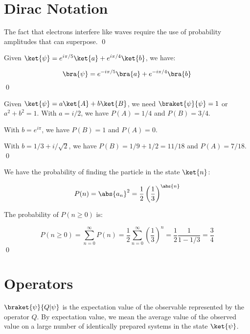 \documentclass[12pt]{article}
\begin{document}



\pagebreak
\section*{Dirac Notation}


The fact that electrons interfere like waves require the use of probability amplitudes that can superpose.
\qed


Given $\ket{\psi} = e^{i\pi/5} \ket{a} + e^{i\pi/4} \ket{b}$, we have:

\begin{equation}
    \bra{\psi} = e^{-i\pi/5} \bra{a} + e^{-i\pi/4} \bra{b}
\end{equation}
\qed



Given $\ket{\psi} = a \ket{A} + b \ket{B}$, we need $\braket{\psi}{\psi} = 1$ or $a^2 + b^2 = 1$. With $a = i/2$, we have $P(A) = 1/4$ and $P(B) = 3/4$.

With $b = e^{i\pi}$, we have $P(B) = 1$ and $P(A) = 0$.

With $b = 1/3 + i/\sqrt{2}$, we have $P(B) = 1/9 + 1/2 = 11/18$ and $P(A) = 7/18$.
\qed


We have the probability of finding the particle in the state $\ket{n}$:

\begin{equation}
    P(n) = \abs{a_n}^2 = \frac{1}{2} \left( \frac{1}{3} \right)^{\abs{n}}
\end{equation}

The probability of $P(n \geq 0)$ is:

\begin{equation}
    P(n \geq 0) = \sum_{n=0}^{\infty} P(n) = \frac{1}{2} \sum_{n=0}^{\infty} \left( \frac{1}{3} \right)^n = \frac{1}{2} \frac{1}{1 - 1/3} = \frac{3}{4}
\end{equation}
\qed


\pagebreak
\section*{Operators}



$\braket{\psi}{Q|\psi}$ is the expectation value of the observable represented by the operator $Q$. By expectation value, we mean the average value of the observed value on a large number of identically prepared systems in the state $\ket{\psi}$.
\end{document}
